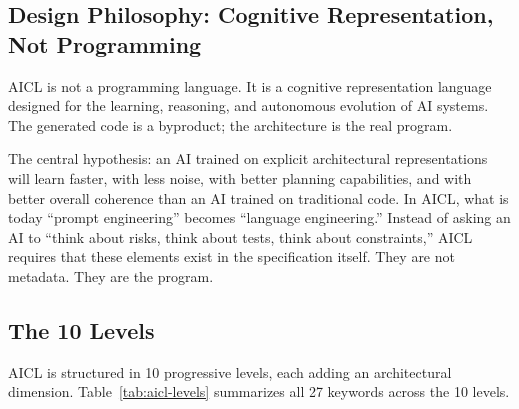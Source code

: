\documentclass[11pt]{article}
\newcommand{\aicl}{\textsc{AICL}}
\begin{document}
\subsection{Design Philosophy: Cognitive Representation, Not Programming}
\label{sec:aicl:philosophy}

\aicl{} is not a programming language. It is a cognitive representation language designed for the learning, reasoning, and autonomous evolution of AI systems. The generated code is a byproduct; the architecture is the real program.

The central hypothesis: an AI trained on explicit architectural representations will learn faster, with less noise, with better planning capabilities, and with better overall coherence than an AI trained on traditional code. In \aicl{}, what is today ``prompt engineering'' becomes ``language engineering.'' Instead of asking an AI to ``think about risks, think about tests, think about constraints,'' \aicl{} requires that these elements exist in the specification itself. They are not metadata. They are the program.

\subsection{The 10 Levels}
\label{sec:aicl:levels}

\aicl{} is structured in 10 progressive levels, each adding an architectural dimension. Table~\ref{tab:aicl-levels} summarizes all 27 keywords across the 10 levels.
\end{document}
